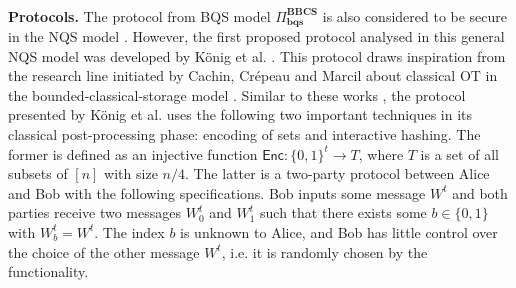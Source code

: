 \

\noindent\textbf{Protocols.} The protocol from BQS model $\Pi^{\textbf{BBCS}}_{\textbf{bqs}}$ is also considered to be secure in the NQS model \cite{S10}. However, the first proposed protocol analysed in this general NQS model was developed by K\"onig et al. \cite{KWW12}. This protocol draws inspiration from the research line initiated by Cachin, Crépeau and Marcil \cite{CCM98} about classical OT in the bounded-classical-storage model \cite{DHRS04, S07}. Similar to these works \cite{CCM98, DHRS04, S07}, the protocol presented by K\"onig et al. \cite{KWW12} uses the following two important techniques in its classical post-processing phase: encoding of sets and interactive hashing. The former is defined as an injective function $\mathsf{Enc}: \{0,1\}^t \rightarrow T$, where $T$ is a set of all subsets of $[n]$ with size $n/4$. The latter is a two-party protocol between Alice and Bob with the following specifications. Bob inputs some message $W^t$ and both parties receive two messages $W^t_0$ and $W^t_1$ such that there exists some $b\in\{0,1\}$ with $W^t_b = W^t$. The index $b$ is unknown to Alice, and Bob has little control over the choice of the other message $W^t$, i.e. it is randomly chosen by the functionality. %


